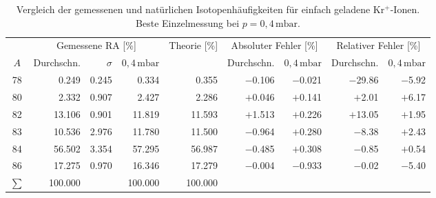 \documentclass{article}
\begin{document}
\begin{table}[htbp]
    \centering
    \caption{Vergleich der gemessenen und nat\"urlichen Isotopenh\"aufigkeiten
        f\"ur einfach geladene Kr$^+$-Ionen. Beste Einzelmessung bei
        $p = 0{,}4\,\mathrm{mbar}$.}
    \label{tab:kr1}
    \begin{adjustbox}{max width=\textwidth}
    \begin{tabular}{c r r r r r r r r}
        \toprule
        & \multicolumn{3}{c}{Gemessene RA [\%]}
        & {Theorie [\%]}
        & \multicolumn{2}{c}{Absoluter Fehler [\%]}
        & \multicolumn{2}{c}{Relativer Fehler [\%]} \\
        \cmidrule(lr){2-4}\cmidrule(lr){6-7}\cmidrule(lr){8-9}
        $A$
        & Durchschn. & $\sigma$ & $0{,}4\,\mathrm{mbar}$
        &
        & Durchschn. & $0{,}4\,\mathrm{mbar}$
        & Durchschn. & $0{,}4\,\mathrm{mbar}$ \\
        \midrule
        78 &  0.249 & 0.245 &  0.334 &  0.355 & $-$0.106 & $-$0.021 & $-$29.86 & $-$5.92 \\
        80 &  2.332 & 0.907 &  2.427 &  2.286 & $+$0.046 & $+$0.141 &  $+$2.01 & $+$6.17 \\
        82 & 13.106 & 0.901 & 11.819 & 11.593 & $+$1.513 & $+$0.226 & $+$13.05 & $+$1.95 \\
        83 & 10.536 & 2.976 & 11.780 & 11.500 & $-$0.964 & $+$0.280 &  $-$8.38 & $+$2.43 \\
        84 & 56.502 & 3.354 & 57.295 & 56.987 & $-$0.485 & $+$0.308 &  $-$0.85 & $+$0.54 \\
        86 & 17.275 & 0.970 & 16.346 & 17.279 & $-$0.004 & $-$0.933 &  $-$0.02 & $-$5.40 \\
        \midrule
        $\sum$ & 100.000 & & 100.000 & 100.000 & & & & \\
        \bottomrule
    \end{tabular}
    \end{adjustbox}
\end{table}
\end{document}
